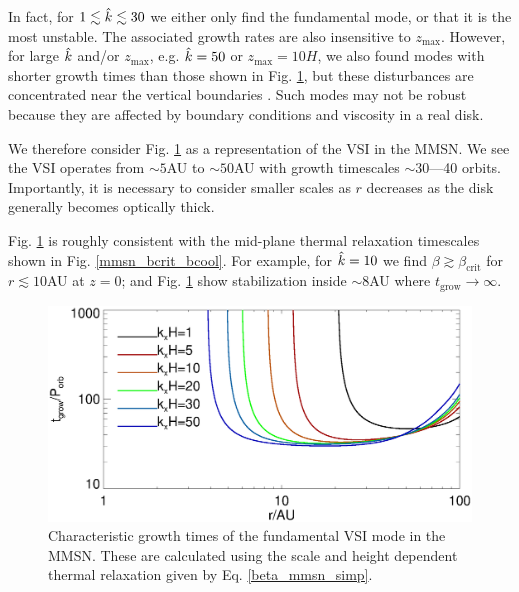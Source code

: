 In fact, for $1\lesssim \hat{k} \lesssim 30$ we either only find the
fundamental mode, or that it is the most unstable. The associated 
growth rates are also insensitive to $z_\mathrm{max}$. However, for
large $\hat{k}$ and/or $z_\mathrm{max}$, e.g. $\hat{k}=50$ or 
$z_\mathrm{max}=10H$, we also found modes with shorter growth times 
than those shown in Fig. \ref{mmsn_overall}, but these disturbances are 
concentrated near the vertical boundaries
\citep{nelson13,mcnally14}. Such modes may not be robust because    
they are affected by boundary conditions and viscosity in a real
disk. %

We therefore consider Fig. \ref{mmsn_overall} as a representation of the
VSI in the MMSN. We see the VSI operates from $\sim 5$AU to $\sim
50$AU with growth timescales $\sim 30$---40 orbits. 
Importantly, it is necessary to consider smaller scales as $r$
decreases as the disk generally becomes optically thick. 

Fig. \ref{mmsn_overall} is roughly consistent with the 
mid-plane thermal relaxation timescales shown in
Fig. \ref{mmsn_bcrit_bcool}. For example, for $\hat{k}=10$ we find 
$\beta \gtrsim \beta_\mathrm{crit}$ for $r\lesssim 10$AU at $z=0$; and
Fig. \ref{mmsn_overall} show stabilization inside $\sim 8$AU where
$t_\mathrm{grow}\to\infty$. 


\begin{figure}
  \includegraphics[width=\linewidth]{figures/eigen_compare_grow.ps}
  \caption{Characteristic growth times of the fundamental VSI mode in
    the MMSN. These are calculated using the scale and height
    dependent thermal relaxation given by Eq. \ref{beta_mmsn_simp}. 
    \label{mmsn_overall}}    
\end{figure}

